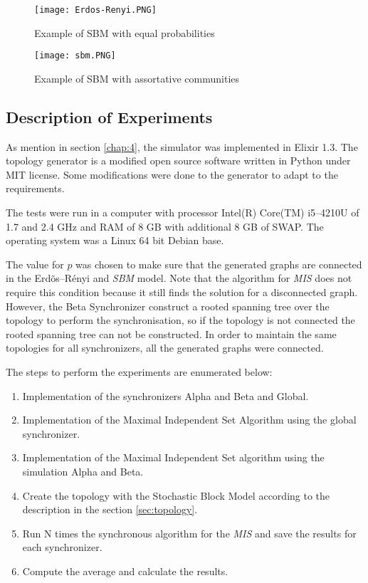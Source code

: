 \begin{figure}[ht]
\centering
\texttt{[image: Erdos-Renyi.PNG]} 
\caption{Example of SBM with equal probabilities}
\label{fig:erdos}
\end{figure}

\begin{figure}[ht]
\centering
\texttt{[image: sbm.PNG]} 
\caption{Example of SBM with assortative communities}
\label{fig:sbm}
\end{figure}

\subsection{Description of Experiments}

As mention in section \ref{chap:4}, the simulator was implemented in Elixir 1.3. The topology generator is a modified open source software written in Python under MIT license. Some modifications were done to the generator to adapt to the requirements. 


The tests were run in a computer with processor Intel(R) Core(TM) i5--4210U of 1.7 and 2.4 GHz and RAM of 8 GB with additional 8 GB of SWAP. The operating system was a Linux 64 bit Debian base.


The value for $p$ was chosen to make sure that the generated graphs are connected in the Erd\~os--R\'enyi and \textit{SBM} model. Note that the algorithm for \textit{MIS} does not require this condition because it still finds the solution for a disconnected graph. However, the Beta Synchronizer construct a rooted spanning tree over the topology to perform the synchronisation, so if the topology is not connected the rooted spanning tree can not be constructed. In order to maintain the same topologies for all synchronizers, all the generated graphs were connected.  

The steps to perform the experiments are enumerated below:

\begin{enumerate}
\item Implementation of the synchronizers Alpha and Beta and Global.
\item Implementation of the Maximal Independent Set Algorithm using the global synchronizer.
\item Implementation of the Maximal Independent Set algorithm using the simulation Alpha and Beta.
\item Create the topology with the Stochastic Block Model according to the description in the section \ref{sec:topology}.
\item Run N times the synchronous algorithm for the \textit{MIS} and save the results for each synchronizer.
\item Compute the average and calculate the results.
\end{enumerate}



